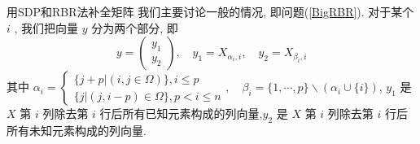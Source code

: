 \documentclass[slidestop,compress,mathserif,UTF8]{beamer}
\numberwithin{equation}{section}                                %
\begin{document}
            \begin{frame}[t]{用SDP和RBR法补全矩阵}
                我们主要讨论一般的情况, 即问题(\ref{BigRBR}). 对于某个 $i$ , 我们把向量 $y$ 分为两个部分, 即
                \begin{equation}\label{BigRBRCondition1}
                    y = \begin{pmatrix}y_1 \\ y_2\end{pmatrix}, \quad
                    y_1 = X_{\alpha_i, i}, \quad
                    y_2 = X_{\beta_i, i}
                \end{equation}
                \small{其中
                $
                    \alpha_i=
                        \begin{cases}
                            \{j + p \vert (i, j \in \Omega)\}, i \leq p\\
                            \{j \vert (j, i - p) \in \Omega\}, p < i \leq n
                        \end{cases}
                        ,\quad
                    \beta_i = 
                        \{1, \cdots, p\} \backslash (\alpha_i \cup \{i\})
                $,
                $y_1$ 是 $X$ 第 $i$ 列除去第 $i$ 行后所有已知元素构成的列向量,$y_2$ 是 $X$ 第 $i$ 列除去第 $i$ 行后所有未知元素构成的列向量.}\normalsize
            \end{frame}
\end{document}
